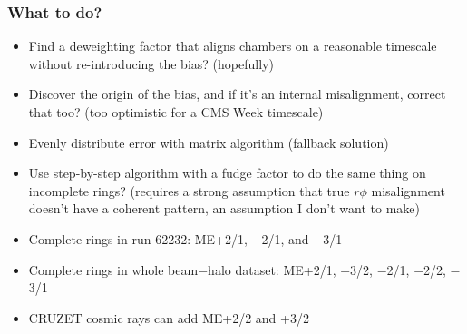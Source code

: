 \documentclass[compress]{beamer}
\begin{document}

\begin{frame}
\frametitle{What to do?}
\small
\begin{itemize}\setlength{\itemsep}{0.2 cm}
\item Find a deweighting factor that aligns chambers on a reasonable
  timescale without re-introducing the bias?  (hopefully)
\item Discover the origin of the bias, and if it's an internal
  misalignment, correct that too?  (too optimistic for a CMS Week
  timescale)
\item Evenly distribute error with matrix algorithm (fallback solution)
\item Use step-by-step algorithm with a fudge factor to do the same
  thing on incomplete rings?  (requires a strong assumption that true
  $r\phi$ misalignment doesn't have a coherent pattern, an assumption
  I don't want to make)
\item Complete rings in run 62232: ME+2/1, $-$2/1, and $-$3/1
\item Complete rings in whole beam$-$halo dataset: ME+2/1, +3/2, $-$2/1, $-$2/2, $-$3/1
\item CRUZET cosmic rays can add ME+2/2 and +3/2
\end{itemize}
\label{numpages}
\end{frame}
\end{document}
